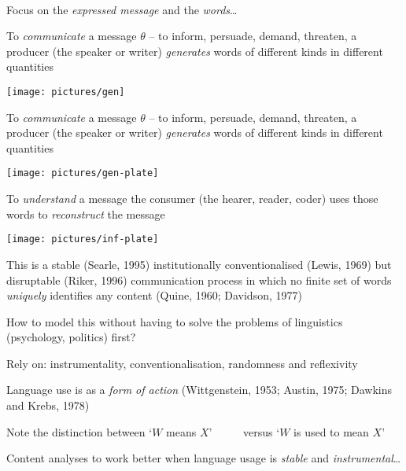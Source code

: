 \documentclass{mediumfoils}
\begin{document}
~\\
Focus on the \textit{expressed message} and the \textit{words}\ldots


To \textsl{communicate} a message $\theta$ -- to inform, persuade, demand, threaten, a producer (the speaker or writer) \textsl{generates} words of different kinds in different quantities


\begin{center}
\texttt{[image: pictures/gen]}
\end{center}


To \textsl{communicate} a message $\theta$ -- to inform, persuade, demand, threaten, a producer (the speaker or writer) \textsl{generates} words of different kinds in different quantities


\begin{center}
\texttt{[image: pictures/gen-plate]}
\end{center}



To \textsl{understand} a message the consumer (the hearer, reader, coder) uses those words to \textsl{reconstruct} the message

\begin{center}
\texttt{[image: pictures/inf-plate]}
\end{center}




This is a stable (Searle, 1995) institutionally conventionalised (Lewis, 1969) but disruptable (Riker, 1996) communication process
in which no finite set of words \textsl{uniquely} identifies any content (Quine, 1960; Davidson, 1977)

How to model this without having to solve the problems of linguistics (psychology, politics) first?

Rely on: instrumentality, conventionalisation, randomness and reflexivity


Language use is as a \textit{form of action} (Wittgenstein, 1953; Austin, 1975; Dawkins and Krebs, 1978)

Note the distinction between
\ita
\itm `$W$ {means} $X$'
\itm ~~~~~versus 
\itm `$W$ {is used to mean} $X$' 
\itz

Content analyses to work better when language usage is \textit{stable} and \textit{instrumental}\ldots
\end{document}
